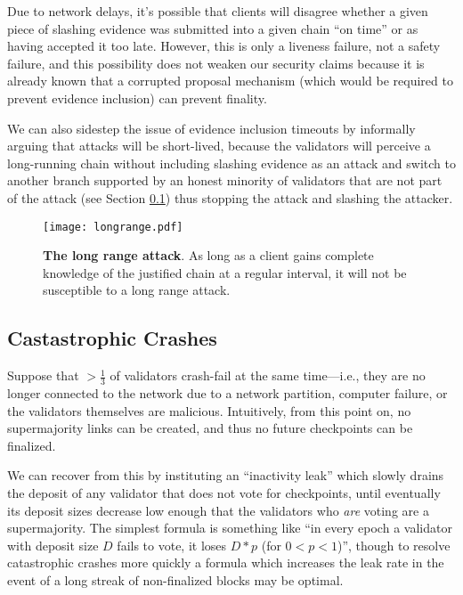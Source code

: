 \documentclass[12pt]{article}
\begin{document}
Due to network delays, it's possible that clients will disagree whether a given piece of slashing evidence was submitted into a given chain ``on time'' or as having accepted it too late. However, this is only a liveness failure, not a safety failure, and this possibility does not weaken our security claims because it is already known that a corrupted proposal mechanism (which would be required to prevent evidence inclusion) can prevent finality.

We can also sidestep the issue of evidence inclusion timeouts by informally arguing that attacks  will be short-lived, because the validators will perceive a long-running chain without including slashing evidence as an attack and switch to another branch supported by an honest minority of validators that are not part of the attack (see Section \ref{sect:leak}) thus stopping the attack and slashing the attacker.

\begin{figure}[tb]
\centering
\texttt{[image: longrange.pdf]}
\caption{\textbf{The long range attack}.  As long as a client gains complete knowledge of the justified chain at a regular interval, it will not be susceptible to a long range attack.}
\label{fig:longrange}
\end{figure}



\subsection{Castastrophic Crashes}
\label{sect:leak}

Suppose that $>\frac{1}{3}$ of validators crash-fail at the same time---i.e., they are no longer connected to the network due to a network partition, computer failure, or the validators themselves are malicious. Intuitively, from this point on, no supermajority links can be created, and thus no future checkpoints can be finalized.

We can recover from this by instituting an ``inactivity leak'' which slowly drains the deposit of any validator that does not vote for checkpoints, until eventually its deposit sizes decrease low enough that the validators who \emph{are} voting are a supermajority.  The simplest formula is something like ``in every epoch a validator with deposit size $D$ fails to vote, it loses $D * p$ (for $0 < p < 1$)'', though to resolve catastrophic crashes more quickly a formula which increases the leak rate in the event of a long streak of non-finalized blocks may be optimal.
\end{document}

